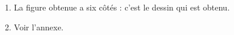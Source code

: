 
\medskip

%
%
\begin{enumerate}
\item La figure obtenue a six côtés : c'est le dessin  qui est obtenu.
%
%
\item  Voir l'annexe.


\end{enumerate}
